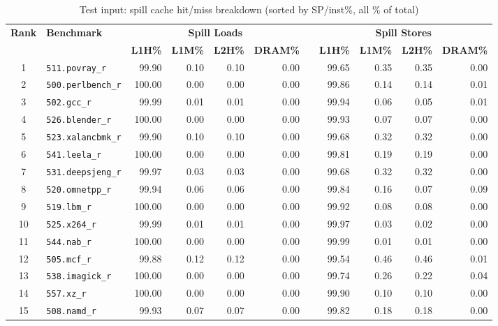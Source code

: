 \documentclass[11pt,a4paper]{article}
\begin{document}
\begin{landscape}
\begin{table}[p]
\centering
\caption{Test input: spill cache hit/miss breakdown (sorted by SP/inst\%, all \% of total)}
\label{tab:sum_test_cache}
\small
\begin{tabular}{clrrrrrrrrr}
\toprule
\multirow{2}{*}{\textbf{Rank}} & \multirow{2}{*}{\textbf{Benchmark}} &
\multicolumn{4}{c}{\textbf{Spill Loads}} & \phantom{x} &
\multicolumn{4}{c}{\textbf{Spill Stores}} \\
\cmidrule{3-6}\cmidrule{8-11}
 & & \textbf{L1H\%} & \textbf{L1M\%} & \textbf{L2H\%} & \textbf{DRAM\%} &
   & \textbf{L1H\%} & \textbf{L1M\%} & \textbf{L2H\%} & \textbf{DRAM\%} \\
\midrule
1 & \texttt{511.povray\_r} & 99.90 & 0.10 & 0.10 & 0.00 & & 99.65 & 0.35 & 0.35 & 0.00 \\
2 & \texttt{500.perlbench\_r} & 100.00 & 0.00 & 0.00 & 0.00 & & 99.86 & 0.14 & 0.14 & 0.01 \\
3 & \texttt{502.gcc\_r} & 99.99 & 0.01 & 0.01 & 0.00 & & 99.94 & 0.06 & 0.05 & 0.01 \\
4 & \texttt{526.blender\_r} & 100.00 & 0.00 & 0.00 & 0.00 & & 99.93 & 0.07 & 0.07 & 0.00 \\
5 & \texttt{523.xalancbmk\_r} & 99.90 & 0.10 & 0.10 & 0.00 & & 99.68 & 0.32 & 0.32 & 0.00 \\
6 & \texttt{541.leela\_r} & 100.00 & 0.00 & 0.00 & 0.00 & & 99.81 & 0.19 & 0.19 & 0.00 \\
7 & \texttt{531.deepsjeng\_r} & 99.97 & 0.03 & 0.03 & 0.00 & & 99.68 & 0.32 & 0.32 & 0.00 \\
8 & \texttt{520.omnetpp\_r} & 99.94 & 0.06 & 0.06 & 0.00 & & 99.84 & 0.16 & 0.07 & 0.09 \\
9 & \texttt{519.lbm\_r} & 100.00 & 0.00 & 0.00 & 0.00 & & 99.92 & 0.08 & 0.08 & 0.00 \\
10 & \texttt{525.x264\_r} & 99.99 & 0.01 & 0.01 & 0.00 & & 99.97 & 0.03 & 0.02 & 0.00 \\
11 & \texttt{544.nab\_r} & 100.00 & 0.00 & 0.00 & 0.00 & & 99.99 & 0.01 & 0.01 & 0.00 \\
12 & \texttt{505.mcf\_r} & 99.88 & 0.12 & 0.12 & 0.00 & & 99.54 & 0.46 & 0.46 & 0.01 \\
13 & \texttt{538.imagick\_r} & 100.00 & 0.00 & 0.00 & 0.00 & & 99.74 & 0.26 & 0.22 & 0.04 \\
14 & \texttt{557.xz\_r} & 100.00 & 0.00 & 0.00 & 0.00 & & 99.90 & 0.10 & 0.10 & 0.00 \\
15 & \texttt{508.namd\_r} & 99.93 & 0.07 & 0.07 & 0.00 & & 99.82 & 0.18 & 0.18 & 0.00 \\
\bottomrule
\end{tabular}
\end{table}
\end{landscape}
\end{document}
